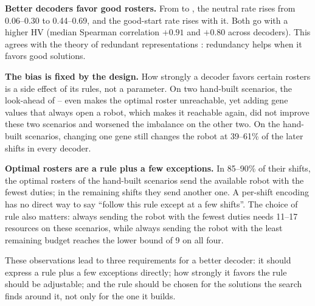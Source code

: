 \textbf{Better decoders favor good rosters.}
From  to , the neutral rate rises from 0.06--0.30 to 0.44--0.69, and the good-start rate rises with it.
Both go with a higher HV (median Spearman correlation $+0.91$ and $+0.80$ across decoders).
This agrees with the theory of redundant representations \cite{rothlauf2006representations}: redundancy helps when it favors good solutions.

\textbf{The bias is fixed by the design.}
How strongly a decoder favors certain rosters is a side effect of its rules, not a parameter.
On two hand-built scenarios, the look-ahead of -- even makes the optimal roster unreachable,
yet adding gene values that always open a robot, which makes it reachable again, did not improve these two scenarios and worsened the imbalance on the other two.
On the hand-built scenarios, changing one gene still changes the robot at 39--61\% of the later shifts in every decoder.

\textbf{Optimal rosters are a rule plus a few exceptions.}
In 85--90\% of their shifts, the optimal rosters of the hand-built scenarios send the available robot with the fewest duties; in the remaining shifts they send another one.
A per-shift encoding has no direct way to say ``follow this rule except at a few shifts''.
The choice of rule also matters: always sending the robot with the fewest duties needs 11--17 resources on these scenarios, while always sending the robot with the least remaining budget reaches the lower bound of 9 on all four.

These observations lead to three requirements for a better decoder:
it should express a rule plus a few exceptions directly;
how strongly it favors the rule should be adjustable;
and the rule should be chosen for the solutions the search finds around it, not only for the one it builds.
